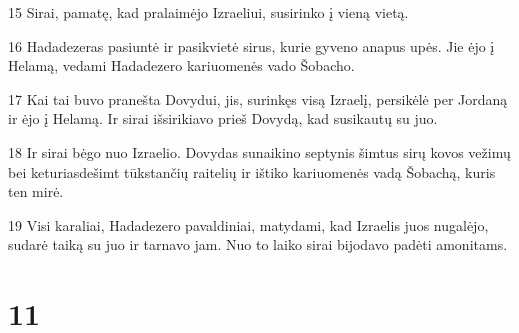 \par 15 Sirai, pamatę, kad pralaimėjo Izraeliui, susirinko į vieną vietą. 
\par 16 Hadadezeras pasiuntė ir pasikvietė sirus, kurie gyveno anapus upės. Jie ėjo į Helamą, vedami Hadadezero kariuomenės vado Šobacho. 
\par 17 Kai tai buvo pranešta Dovydui, jis, surinkęs visą Izraelį, persikėlė per Jordaną ir ėjo į Helamą. Ir sirai išsirikiavo prieš Dovydą, kad susikautų su juo. 
\par 18 Ir sirai bėgo nuo Izraelio. Dovydas sunaikino septynis šimtus sirų kovos vežimų bei keturiasdešimt tūkstančių raitelių ir ištiko kariuomenės vadą Šobachą, kuris ten mirė. 
\par 19 Visi karaliai, Hadadezero pavaldiniai, matydami, kad Izraelis juos nugalėjo, sudarė taiką su juo ir tarnavo jam. Nuo to laiko sirai bijodavo padėti amonitams.



\chapter{11}

